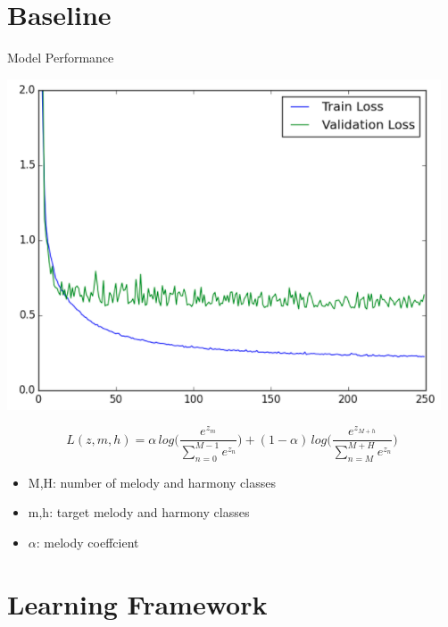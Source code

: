 \documentclass{beamer}
\begin{document}
\section{Baseline}
\begin{frame}{Model Performance} 
  \begin{center} 
  \includegraphics[scale=0.3]{baseline_performance} 
  \end{center} 
\small \[L(z, m, h) =  \alpha \, log \bigg( \frac{ e^{z_m} }{ \sum_{n=0}^{M-1}{ e^{z_n}}} \bigg) + (1 - \alpha) \, log \bigg( \frac{ e^{z_{M+h}} }{ \sum_{n=M}^{M+H}{ e^{z_n}}} \bigg)\] 
\begin{itemize} 
  \item 
  \small M,H: number of melody and  harmony classes 
  \item 
  \small m,h: target melody and harmony classes 
  \item 
  \small $\alpha$: melody coeffcient 
\end{itemize}
\end{frame}

\section{Learning Framework}
\end{document}
